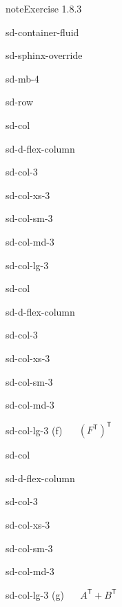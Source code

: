 \documentclass[letterpaper,10pt,english]{jupyterBook}
\begin{document}
\begin{sphinxadmonition}{note}{Exercise 1.8.3}
\begin{sphinxuseclass}{sd-container-fluid}
\begin{sphinxuseclass}{sd-sphinx-override}
\begin{sphinxuseclass}{sd-mb-4}
\begin{sphinxuseclass}{sd-row}
\begin{sphinxuseclass}{sd-col}
\begin{sphinxuseclass}{sd-d-flex-column}
\begin{sphinxuseclass}{sd-col-3}
\begin{sphinxuseclass}{sd-col-xs-3}
\begin{sphinxuseclass}{sd-col-sm-3}
\begin{sphinxuseclass}{sd-col-md-3}
\begin{sphinxuseclass}{sd-col-lg-3}
\end{sphinxuseclass}
\end{sphinxuseclass}
\end{sphinxuseclass}
\end{sphinxuseclass}
\end{sphinxuseclass}
\end{sphinxuseclass}
\end{sphinxuseclass}
\begin{sphinxuseclass}{sd-col}
\begin{sphinxuseclass}{sd-d-flex-column}
\begin{sphinxuseclass}{sd-col-3}
\begin{sphinxuseclass}{sd-col-xs-3}
\begin{sphinxuseclass}{sd-col-sm-3}
\begin{sphinxuseclass}{sd-col-md-3}
\begin{sphinxuseclass}{sd-col-lg-3}
\sphinxAtStartPar
(f)   \((F^\mathsf{T})^\mathsf{T}\)

\end{sphinxuseclass}
\end{sphinxuseclass}
\end{sphinxuseclass}
\end{sphinxuseclass}
\end{sphinxuseclass}
\end{sphinxuseclass}
\end{sphinxuseclass}
\begin{sphinxuseclass}{sd-col}
\begin{sphinxuseclass}{sd-d-flex-column}
\begin{sphinxuseclass}{sd-col-3}
\begin{sphinxuseclass}{sd-col-xs-3}
\begin{sphinxuseclass}{sd-col-sm-3}
\begin{sphinxuseclass}{sd-col-md-3}
\begin{sphinxuseclass}{sd-col-lg-3}
\sphinxAtStartPar
(g)   \(A^\mathsf{T} + B^\mathsf{T}\)


\end{sphinxuseclass}
\end{sphinxuseclass}
\end{sphinxuseclass}
\end{sphinxuseclass}
\end{sphinxuseclass}
\end{sphinxuseclass}
\end{sphinxuseclass}
\end{sphinxuseclass}
\end{sphinxuseclass}
\end{sphinxuseclass}
\end{sphinxuseclass}
\end{sphinxadmonition}
\end{document}
